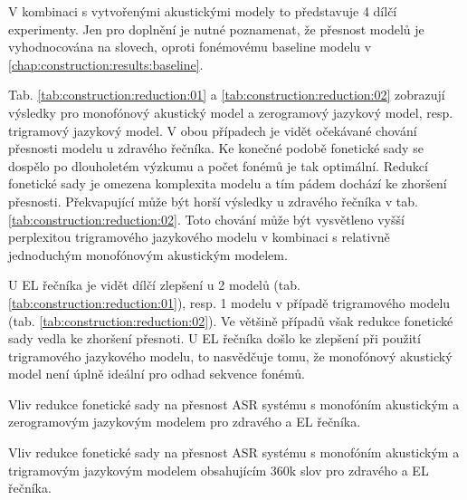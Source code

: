 \noindent V kombinaci s vytvořenými akustickými modely to představuje 4 dílčí experimenty. Jen pro doplnění je nutné poznamenat, že přesnost modelů je vyhodnocována na slovech, oproti fonémovému baseline modelu v \ref{chap:construction:results:baseline}.

Tab. \ref{tab:construction:reduction:01} a \ref{tab:construction:reduction:02} zobrazují výsledky pro monofónový akustický model a zerogramový jazykový model, resp. trigramový jazykový model. V obou případech je vidět očekávané chování přesnosti modelu u zdravého řečníka. Ke konečné podobě fonetické sady se dospělo po dlouholetém výzkumu a počet fonémů je tak optimální. Redukcí fonetické sady je omezena komplexita modelu a tím pádem dochází ke zhoršení přesnosti. Překvapující může být horší výsledky u zdravého řečníka v tab. \ref{tab:construction:reduction:02}. Toto chování může být vysvětleno vyšší perplexitou trigramového jazykového modelu v kombinaci s relativně jednoduchým monofónovým akustickým modelem.

U EL řečníka je vidět dílčí zlepšení u 2 modelů (tab. \ref{tab:construction:reduction:01}), resp. 1 modelu v případě trigramového modelu (tab. \ref{tab:construction:reduction:02}). Ve většině případů však redukce fonetické sady vedla ke zhoršení přesnoti. U EL řečníka došlo ke zlepšení při použití trigramového jazykového modelu, to nasvědčuje tomu, že monofónový akustický model není úplně ideální pro odhad sekvence fonémů.

\begin{table}[htpb]
  \centering
  \def\arraystretch{1.5}
  \caption{Vliv redukce fonetické sady na přesnost ASR systému s monofóním akustickým a zerogramovým jazykovým modelem pro zdravého a EL řečníka.}
  \label{tab:construction:reduction:01}
\end{table}

\begin{table}[htpb]
  \centering
  \def\arraystretch{1.5}
  \caption{Vliv redukce fonetické sady na přesnost ASR systému s monofóním akustickým a trigramovým jazykovým modelem obsahujícím 360k slov pro zdravého a EL řečníka.}
  \label{tab:construction:reduction:02}
\end{table}

